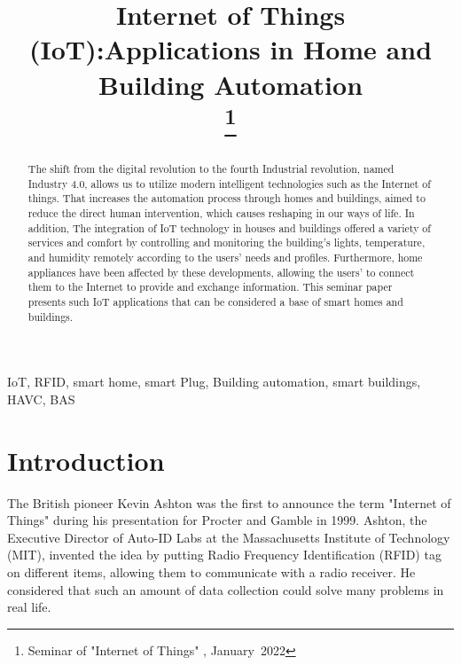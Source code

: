 \documentclass[conference]{IEEEtran}
\begin{document}
\title{Internet of Things (IoT):Applications in  Home and Building Automation 
	\\

\thanks{Seminar of  "Internet of  Things" , January~2022}
}

\author{

}

\maketitle

\begin{abstract}
	
The shift from the digital revolution to the fourth Industrial revolution, named Industry 4.0, allows us to utilize modern intelligent technologies such as the Internet of things. That increases the automation process through homes and buildings, aimed to reduce the direct human intervention, which causes reshaping in our ways of life. In addition, The integration of  IoT technology in houses and buildings offered a variety of services and comfort by controlling and monitoring the building's lights, temperature, and humidity remotely according to the users' needs and profiles. Furthermore, home appliances have been affected by these developments, allowing the users' to connect them to the Internet to provide and exchange information. This seminar paper presents such IoT applications that can be considered a base of smart homes and buildings. 



\end{abstract}

\begin{IEEEkeywords}
IoT, RFID, smart home, smart Plug, Building automation, smart buildings, HAVC, BAS 
\end{IEEEkeywords}

\section{Introduction}


The British pioneer Kevin Ashton was the first to announce the term "Internet of Things" during his presentation for Procter and Gamble in 1999. Ashton, the Executive Director of Auto-ID Labs at the Massachusetts Institute of Technology (MIT), invented the idea by putting Radio Frequency Identification (RFID) tag on different items, allowing them to communicate with a radio receiver. He considered that such an amount of data collection could solve many problems in real life. 
\end{document}
